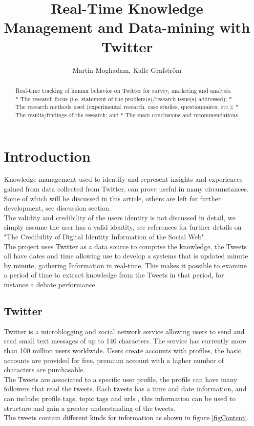 \documentclass[]{article}  %
\begin{document}
\title{Real-Time Knowledge Management and Data-mining with Twitter}   %
\author{Martin Moghadam, Kalle Grafstr\"{o}m}         %
\maketitle

\begin{abstract}
  Real-time tracking of human behavior on Twitter for survey, marketing and analysis. \\     * The research focus (i.e. statement of the problem(s)/research issue(s) addressed);
    * The research methods used (experimental research, case studies, questionnaires, etc.);
    * The results/findings of the research; and
    * The main conclusions and recommendations

\end{abstract}

\section{Introduction}
Knowledge management used to identify and represent insights and experiences gained from data collected from Twitter, can prove useful in many circumstances. Some of which will be discussed in this article, others are left for further development, see discussion section. \\ The validity and credibility of the users identity is not discussed  in detail, we simply assume the user has a valid identity, see references for further details on "The Credibility of Digital Identity Information of the Social Web". \\ The project uses Twitter as a data source to comprise the knowledge, the Tweets all have dates and time allowing use to develop a systems that is updated minute by minute, gathering Information in real-time. This makes it possible to examine a period of time to extract knowledge from the Tweets in that period, for instance a debate performance\cite{bib10}.\\ 

	
\subsection{Twitter}
Twitter is a microblogging and social network service allowing users to send and read small text messages of up to 140 characters. The service has currently more than 100 million users worldwide. Users create accounts with profiles, the basic accounts are provided for free, premium account with a higher number of characters are purchasable. \\ The Tweets are associated to a specific user profile, the profile can have many followers that read the tweets. Each tweets has a time and date information, and can include; profile tags, topic tags and urls , this information can be used to structure and gain a greater understanding of the tweets. \\ The tweets contain different kinds for information as shown in figure \ref{figContent}. 
\end{document}
